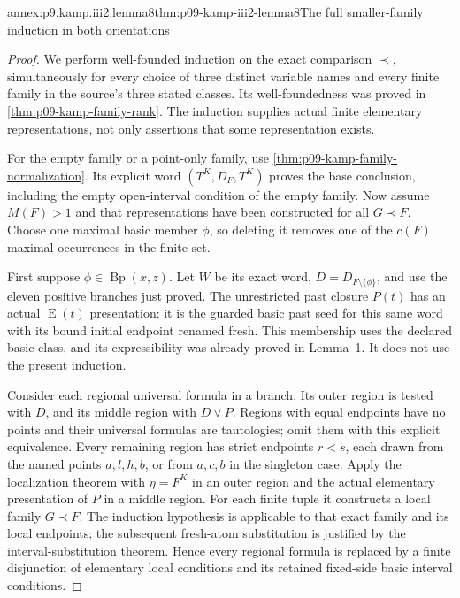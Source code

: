 \begin{annexitem}{annex:p9.kamp.iii2.lemma8}{thm:p09-kamp-iii2-lemma8}{The full smaller-family induction in both orientations}
\begin{proof}
We perform well-founded induction on the exact comparison \(\prec\),
simultaneously for every choice of three distinct variable names and
every finite family in the source's three stated classes. Its
well-foundedness was proved in \cref{thm:p09-kamp-family-rank}.
The induction supplies actual finite elementary representations,
not only assertions that some representation exists.

For the empty family or a point-only family, use
\cref{thm:p09-kamp-family-normalization}. Its explicit word
\((T^K,D_F,T^K)\) proves the base conclusion, including the
empty open-interval condition of the empty family. Now assume
\(M(F)>1\) and that representations have been constructed
for all \(G\prec F\). Choose one maximal basic member
\(\phi\), so deleting it removes one of the \(c(F)\)
maximal occurrences in the finite set.

First suppose \(\phi\in\operatorname{Bp}(x,z)\).
Let \(W\) be its exact word, \(D=D_{F\setminus\{\phi\}}\),
and use the eleven positive branches just proved. The unrestricted
past closure \(P(t)\) has an actual \(\operatorname{E}(t)\)
presentation: it is the guarded basic past seed for this same
word with its bound initial endpoint renamed fresh. This membership
uses the declared basic class, and its expressibility was already
proved in Lemma~1. It does not use the present induction.

Consider each regional universal formula in a branch. Its outer
region is tested with \(D\), and its middle region with
\(D\lor P\). Regions with equal endpoints have no points
and their universal formulas are tautologies; omit them with this
explicit equivalence. Every remaining region has strict endpoints
\(r<s\), each drawn from the named points \(a,l,h,b\),
or from \(a,c,b\) in the singleton case. Apply the localization
theorem with \(\eta=F^K\) in an outer region and the
actual elementary presentation of \(P\) in a middle region.
For each finite tuple it constructs a local family \(G\prec F\).
The induction hypothesis is applicable to that exact family and
its local endpoints; the subsequent fresh-atom substitution is
justified by the interval-substitution theorem. Hence every regional
formula is replaced by a finite disjunction of elementary local
conditions and its retained fixed-side basic interval conditions.


\end{proof}
\end{annexitem}

